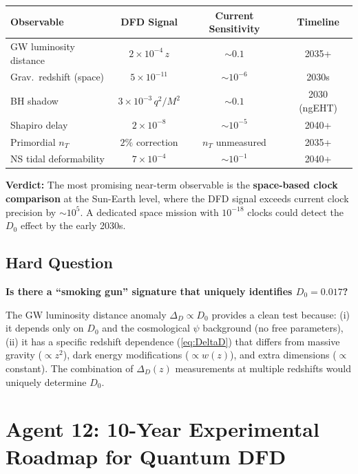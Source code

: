 \documentclass[11pt,a4paper]{article}
\begin{document}
\begin{center}
\begin{tabular}{lccc}
\toprule
\textbf{Observable} & \textbf{DFD Signal} & \textbf{Current Sensitivity} & \textbf{Timeline} \\
\midrule
GW luminosity distance & $2\times 10^{-4}\,z$ & $\sim 0.1$ & 2035+ \\
Grav.\ redshift (space) & $5\times 10^{-11}$ & $\sim 10^{-6}$ & 2030s \\
BH shadow & $3\times 10^{-3}\,q^2/M^2$ & $\sim 0.1$ & 2030 (ngEHT) \\
Shapiro delay & $2\times 10^{-8}$ & $\sim 10^{-5}$ & 2040+ \\
Primordial $n_T$ & $2\%$ correction & $n_T$ unmeasured & 2035+ \\
NS tidal deformability & $7\times 10^{-4}$ & $\sim 10^{-1}$ & 2040+ \\
\bottomrule
\end{tabular}
\end{center}

\textbf{Verdict:} The most promising near-term observable is the \textbf{space-based clock comparison} at the Sun-Earth level, where the DFD signal exceeds current clock precision by $\sim 10^5$. A dedicated space mission with $10^{-18}$ clocks could detect the $D_0$ effect by the early 2030s.

\subsection{Hard Question}

\textbf{Is there a ``smoking gun'' signature that uniquely identifies $D_0 = 0.017$?}

The GW luminosity distance anomaly $\Delta_D \propto D_0$ provides a clean test because: (i) it depends only on $D_0$ and the cosmological $\psi$ background (no free parameters), (ii) it has a specific redshift dependence (\ref{eq:DeltaD}) that differs from massive gravity ($\propto z^2$), dark energy modifications ($\propto w(z)$), and extra dimensions ($\propto$ constant). The combination of $\Delta_D(z)$ measurements at multiple redshifts would uniquely determine $D_0$.

\newpage
\section{Agent 12: 10-Year Experimental Roadmap for Quantum DFD}
\label{sec:agent12}
\end{document}
